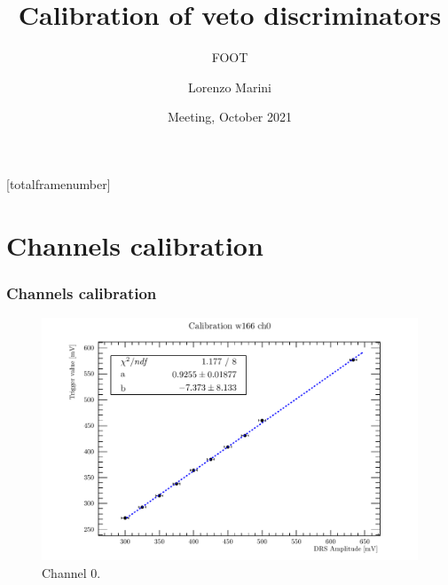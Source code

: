 \documentclass[9pt]{beamer}
\title{Calibration of veto discriminators}
\subtitle[]{FOOT}
\author{Lorenzo Marini}
\institute{INFN, Pisa}
\date[October 2021] %
{Meeting, October 2021}
\begin{document}
[totalframenumber] 

\frame{\titlepage}



\begin{frame} 
  	\tableofcontents
\end{frame}


\section{Channels calibration}
\begin{frame} [fragile]
\small
	\frametitle{Channels calibration}
    		\begin{figure}
		 \centering
			\includegraphics[scale=0.5]{figures/ch0.pdf}
			\caption{Channel 0.}
		\end{figure}  
\end{frame}

\end{document}
